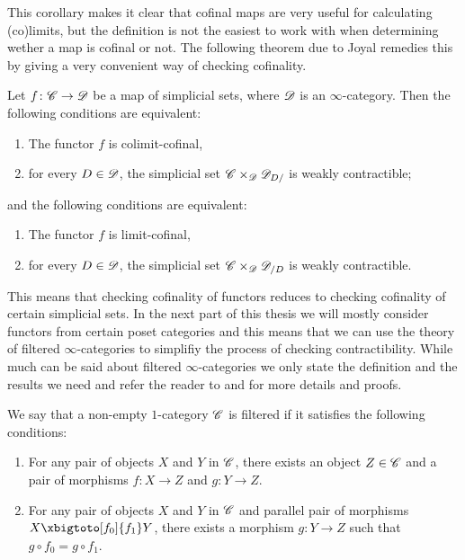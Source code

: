 \documentclass[../../thesis.tex]{subfiles}
\begin{document}
This corollary makes it clear that cofinal maps are very useful for calculating (co)limits, but the definition is not the easiest to work with when determining wether a map is cofinal or not.
The following theorem due to Joyal remedies this by giving a very convenient way of checking cofinality.
\begin{theorem}{\cite[\href{https://kerodon.net/tag/02NY}{Theorem 02NY}]{kerodon}\label{superlemma}}
    Let \(f\colon \mathscr{C} \to \mathscr{D}\) be a map of simplicial sets, where $\mathscr{D}$ is an $\infty$-category.
    Then the following conditions are equivalent:
    \begin{enumerate}
        \item The functor $f$ is colimit-cofinal,
        \item for every $D\in \mathscr{D}$, the simplicial set $\mathscr{C}\times_{\mathscr{D}} \mathscr{D}_{D/}$ is weakly contractible;
    \end{enumerate}
    and the following conditions are equivalent:
    \begin{enumerate}
        \item The functor $f$ is limit-cofinal,
        \item for every $D\in \mathscr{D}$, the simplicial set $\mathscr{C}\times_{\mathscr{D}} \mathscr{D}_{/D}$ is weakly contractible.
    \end{enumerate}
\end{theorem}
This means that checking cofinality of functors reduces to checking cofinality of certain simplicial sets.
In the next part of this thesis we will mostly consider functors from certain poset categories and this means that we can use the theory of filtered $\infty$-categories to simplifiy the process of checking contractibility.
While much can be said about filtered $\infty$-categories we only state the definition and the results we need and refer the reader to \cite[\href{https://kerodon.net/tag/02P8}{Subsection 02P8}]{kerodon} and \cite[Section 5.3.1]{HTT} for more details and proofs.
\begin{definition}
    We say that a non-empty $1$-category $\mathscr{C}$ is filtered if it satisfies the following conditions:
    \begin{enumerate}
        \item For any pair of objects $X$ and $Y$ in $\mathscr{C}$, there exists an object $Z \in \mathscr{C}$ and a pair of morphisms $f \colon X\to Z$ and $g \colon Y\to Z$.
        \item For any pair of objects $X$ and $Y$ in $\mathscr{C}$ and parallel pair of morphisms $X \xbigtoto[f_0]{f_1} Y$, there exists a morphism $g \colon Y \to Z$ such that $g \circ f_0 = g \circ f_1$.
    \end{enumerate}
\end{definition}
\end{document}
